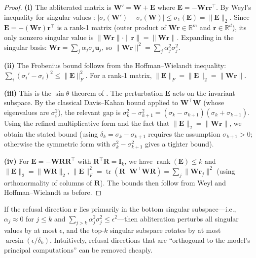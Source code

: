 \begin{proof}
\textbf{(i)} The abliterated matrix is $\mathbf{W}' = \mathbf{W} + \mathbf{E}$ where $\mathbf{E} = -\mathbf{W}\mathbf{r}\mathbf{r}^\top$.
By Weyl's inequality for singular values \citep{stewart1990matrix}: $|\sigma_i(\mathbf{W}') - \sigma_i(\mathbf{W})| \leq \sigma_1(\mathbf{E}) = \|\mathbf{E}\|_2$.
Since $\mathbf{E} = -(\mathbf{W}\mathbf{r})\mathbf{r}^\top$ is a rank-1 matrix (outer product of $\mathbf{W}\mathbf{r} \in \mathbb{R}^m$ and $\mathbf{r} \in \mathbb{R}^d$), its only nonzero singular value is $\|\mathbf{W}\mathbf{r}\| \cdot \|\mathbf{r}\| = \|\mathbf{W}\mathbf{r}\|$.
Expanding in the singular basis: $\mathbf{W}\mathbf{r} = \sum_j \alpha_j \sigma_j \mathbf{u}_j$, so $\|\mathbf{W}\mathbf{r}\|^2 = \sum_j \alpha_j^2 \sigma_j^2$.

\textbf{(ii)} The Frobenius bound follows from the Hoffman--Wielandt inequality: $\sum_i (\sigma_i' - \sigma_i)^2 \leq \|\mathbf{E}\|_F^2$.
For a rank-1 matrix, $\|\mathbf{E}\|_F = \|\mathbf{E}\|_2 = \|\mathbf{W}\mathbf{r}\|$.

\textbf{(iii)} This is the $\sin\theta$ theorem of \citet{davis1970rotation}.
The perturbation $\mathbf{E}$ acts on the invariant subspace.
By the classical Davis--Kahan bound applied to $\mathbf{W}^\top \mathbf{W}$ (whose eigenvalues are $\sigma_i^2$), the relevant gap is $\sigma_k^2 - \sigma_{k+1}^2 = (\sigma_k - \sigma_{k+1})(\sigma_k + \sigma_{k+1})$.
Using the refined multiplicative form and the fact that $\|\mathbf{E}\|_2 = \|\mathbf{W}\mathbf{r}\|$, we obtain the stated bound (using $\delta_k = \sigma_k - \sigma_{k+1}$ requires the assumption $\sigma_{k+1} > 0$; otherwise the symmetric form with $\sigma_k^2 - \sigma_{k+1}^2$ gives a tighter bound).

\textbf{(iv)} For $\mathbf{E} = -\mathbf{W}\mathbf{R}\mathbf{R}^\top$ with $\mathbf{R}^\top\mathbf{R} = \mathbf{I}_k$, we have $\operatorname{rank}(\mathbf{E}) \leq k$ and $\|\mathbf{E}\|_2 = \|\mathbf{W}\mathbf{R}\|_2$, $\|\mathbf{E}\|_F^2 = \operatorname{tr}(\mathbf{R}^\top \mathbf{W}^\top \mathbf{W} \mathbf{R}) = \sum_j \|\mathbf{W}\mathbf{r}_j\|^2$ (using orthonormality of columns of $\mathbf{R}$).
The bounds then follow from Weyl and Hoffman--Wielandt as before.
\end{proof}

\begin{corollary}
\label{cor:capability}
If the refusal direction $\mathbf{r}$ lies primarily in the bottom singular subspace---i.e., $\alpha_j \approx 0$ for $j \leq k$ and $\sum_{j > k} \alpha_j^2 \sigma_j^2 \leq \epsilon^2$---then abliteration perturbs all singular values by at most $\epsilon$, and the top-$k$ singular subspace rotates by at most $\arcsin(\epsilon / \delta_k)$.
Intuitively, refusal directions that are ``orthogonal to the model's principal computations'' can be removed cheaply.
\end{corollary}

